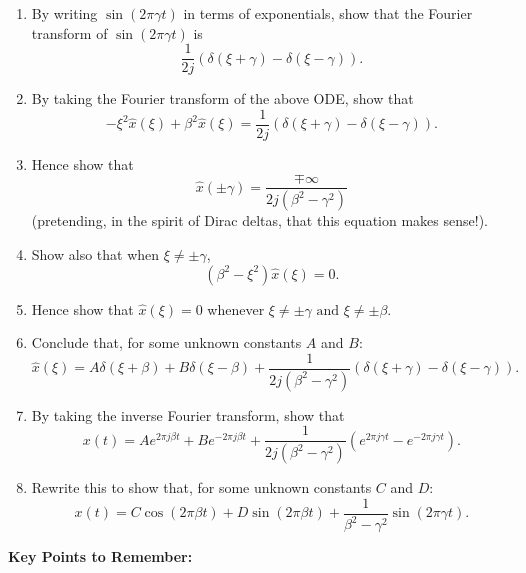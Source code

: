 \documentclass{article}
\begin{document}
\begin{enumerate}
	\item By writing $\sin(2\pi\gamma t)$ in terms of exponentials, show that the Fourier transform of $\sin(2\pi \gamma t)$ is
		\[\frac{1}{2j}\left(\delta(\xi+\gamma)-\delta(\xi-\gamma)\right).\]
	\item By taking the Fourier transform of the above ODE, show that
		\[-\xi^2\hat{x}(\xi)+\beta^2\hat{x}(\xi)=\frac{1}{2j}\left(\delta(\xi+\gamma)-\delta(\xi-\gamma)\right).\]
	\item Hence show that
		\[\hat{x}\left(\pm\gamma\right) = \frac{\mp\infty}{2j\left(\beta^2 -\gamma^2\right)}\]
		(pretending, in the spirit of Dirac deltas, that this equation makes sense!).
	\item Show also that when $\xi\neq \pm \gamma$,
		\[\left(\beta^2-\xi^2 \right)\hat{x}(\xi)=0.\]
	\item Hence show that $\hat{x}(\xi)=0$ whenever $\xi\neq\pm\gamma \mbox{ and } \xi\neq \pm\beta$.
	\item Conclude that, for some unknown constants $A$ and $B$:
		\[\hat{x}(\xi)=A\delta\left(\xi+\beta\right)+B\delta\left(\xi-\beta\right)+ \frac{1}{2j\left(\beta^2 -\gamma^2\right)}\left(\delta(\xi+\gamma)- \delta(\xi-\gamma)\right).\]
	\item By taking the inverse Fourier transform, show that
		\[x(t)=Ae^{ 2\pi j\beta t}+Be^{-2\pi j\beta t}+\frac{1}{2j\left(\beta^2-\gamma^2\right)}\left(e^{2\pi j\gamma t}-e^{-2\pi j\gamma t}\right).\]
	\item Rewrite this to show that, for some unknown constants $C$ and $D$:
		\[x(t)=C\cos(2\pi \beta t) + D\sin(2\pi\beta t) + \frac{1}{\beta^2-\gamma^2}\sin(2\pi \gamma t).\]
\end{enumerate}














\clearpage




{\bf Key Points to Remember:}

\vspace{5mm}
\end{document}
